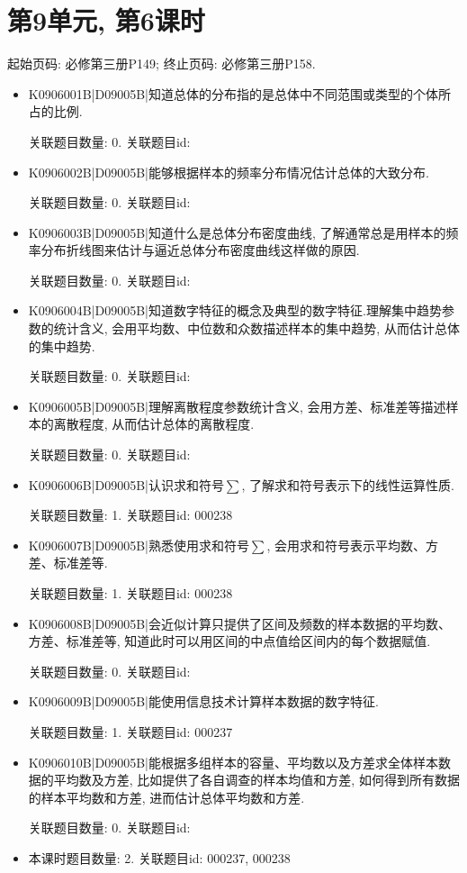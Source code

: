 \section*{第9单元, 第6课时}
起始页码: 必修第三册P149; 终止页码: 必修第三册P158.
\begin{itemize}
\item K0906001B|D09005B|知道总体的分布指的是总体中不同范围或类型的个体所占的比例.

关联题目数量: 0. 关联题目id: 

\item K0906002B|D09005B|能够根据样本的频率分布情况估计总体的大致分布.

关联题目数量: 0. 关联题目id: 

\item K0906003B|D09005B|知道什么是总体分布密度曲线, 了解通常总是用样本的频率分布折线图来估计与逼近总体分布密度曲线这样做的原因.

关联题目数量: 0. 关联题目id: 

\item K0906004B|D09005B|知道数字特征的概念及典型的数字特征.理解集中趋势参数的统计含义, 会用平均数、中位数和众数描述样本的集中趋势, 从而估计总体的集中趋势.

关联题目数量: 0. 关联题目id: 

\item K0906005B|D09005B|理解离散程度参数统计含义, 会用方差、标准差等描述样本的离散程度, 从而估计总体的离散程度.

关联题目数量: 0. 关联题目id: 

\item K0906006B|D09005B|认识求和符号$\sum$, 了解求和符号表示下的线性运算性质.

关联题目数量: 1. 关联题目id: 000238

\item K0906007B|D09005B|熟悉使用求和符号$\sum$, 会用求和符号表示平均数、方差、标准差等.

关联题目数量: 1. 关联题目id: 000238

\item K0906008B|D09005B|会近似计算只提供了区间及频数的样本数据的平均数、方差、标准差等, 知道此时可以用区间的中点值给区间内的每个数据赋值.

关联题目数量: 0. 关联题目id: 

\item K0906009B|D09005B|能使用信息技术计算样本数据的数字特征.

关联题目数量: 1. 关联题目id: 000237

\item K0906010B|D09005B|能根据多组样本的容量、平均数以及方差求全体样本数据的平均数及方差, 比如提供了各自调查的样本均值和方差, 如何得到所有数据的样本平均数和方差, 进而估计总体平均数和方差.

关联题目数量: 0. 关联题目id: 

\item 本课时题目数量: 2. 关联题目id: 000237, 000238

\end{itemize}

